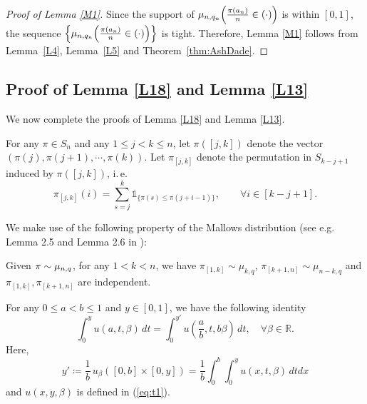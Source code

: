 \begin{proof}[Proof of Lemma \ref{M1}]
Since the support of $\mu_{n, q_n} \Big( \frac{\pi(a_n)}{n} \in (\cdot) \Big)$ is within $[0, 1]$, the sequence
$\left\{ \mu_{n, q_n} \Big( \frac{\pi(a_n)}{n} \in (\cdot) \Big) \right\}$ is tight.
Therefore, Lemma \ref{M1} follows from Lemma~\ref{L4}, Lemma~\ref{L5} and Theorem~\ref{thm:AshDade}.
\end{proof}



\subsection{Proof of Lemma \ref{L18} and Lemma \ref{L13}}\label{section5}
We now complete the proofs of Lemma \ref{L18} and Lemma \ref{L13}.
\begin{definition}
For any $\pi \in S_n$ and any $ 1 \le j < k \le n$, let $\pi([j, k])$ denote the vector $\left( \pi(j), \pi(j+1), \cdots, \pi(k) \right)$.
Let $\pi_{[j, k]}$ denote the permutation in $S_{k-j+1}$ induced by $\pi([j, k])$, i.\,e.
\[
\pi_{[j, k]}(i) = \sum_{s = j}^{k} \mathds{1}_{\{\pi(s) \le \pi(j+i-1) \}}, \qquad  \forall i \in [k-j+1].
\]
\end{definition}

We make use of the following property of the Mallows distribution (see e.g. Lemma 2.5 and Lemma 2.6 in \cite{Naya}):
\begin{proposition}\label{P2}
Given $\pi \sim \mu_{n, q}$, for any $1 < k < n$, we have $\pi_{[1, k]} \sim \mu_{k, q}$, $\pi_{[k+1, n]} \sim \mu_{n-k, q}$ and $\pi_{[1, k]}, \pi_{[k+1, n]}$ are independent.
\end{proposition}







\begin{lemma}\label{L11}
For any $0 \le a < b \le 1$ and $y \in [0, 1]$, we have the following identity
\[
\int_{0}^{y} u(a, t, \beta)\,dt = \int_{0}^{y'} u\left(\frac{a}{b}, t, b \beta\right)\,dt, \quad \forall \beta \in \mathbb{R}.
\]
Here,
\[
y' \coloneqq \frac{1}{b}\,u_{\beta}([0, b]\times[0, y]) = \frac{1}{b} \int_{0}^{b}\int_{0}^{y} u(x, t, \beta)\, dtdx
\]
and $u(x, y, \beta)$ is defined in (\ref{eq:t1}).
\end{lemma}

